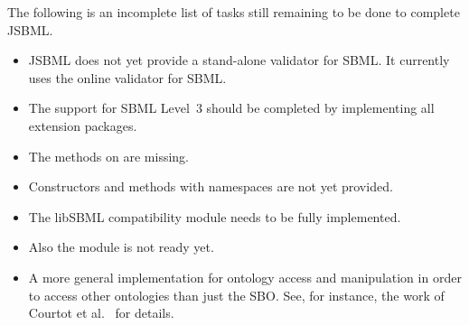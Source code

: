 
The following is an incomplete list of tasks still remaining to be done to
complete JSBML.

\begin{itemize}

\item JSBML does not yet provide a stand-alone validator for SBML. It
  currently uses the online validator for SBML.

\item The support for SBML Level~3 should be completed
  by implementing all extension packages.

\item The 
  methods on  are missing.

\item Constructors and methods with namespaces are not yet provided.

\item The libSBML compatibility module
  needs to be fully implemented.

\item Also the  module is not ready yet.

\item A more general implementation for ontology access and manipulation in
  order to access other ontologies than just the SBO. See, for instance,
  the work of Courtot et al.~\cite{Courtot2011a} for details.

\end{itemize}

